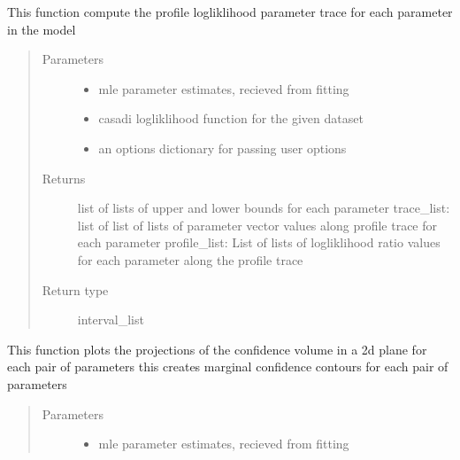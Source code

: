 \documentclass[letterpaper,10pt,english,openany,oneside]{sphinxmanual}
\begin{document}
\begin{fulllineitems}
\begin{fulllineitems}
\label{\detokenize{nloed:nloed.model.Model.__profiletrace}}
This function compute the profile logliklihood parameter trace for each parameter in the model
\begin{quote}\begin{description}
\item[{Parameters}] \leavevmode\begin{itemize}
\item {} 
 \textendash{} mle parameter estimates,  recieved from fitting

\item {} 
 \textendash{} casadi logliklihood function for the given dataset

\item {} 
 \textendash{} an options dictionary for passing user options

\end{itemize}

\item[{Returns}] \leavevmode
list of lists of upper and lower bounds for each parameter
trace\_list: list of list of lists of parameter vector values along profile trace for each parameter
profile\_list: List of lists of logliklihood ratio values for each parameter along the profile trace

\item[{Return type}] \leavevmode
interval\_list

\end{description}\end{quote}

\end{fulllineitems}


\begin{fulllineitems}
\label{\detokenize{nloed:nloed.model.Model.__contourplot}}
This function plots the projections of the confidence volume in a 2d plane for each pair of parameters
this creates marginal confidence contours for each pair of parameters
\begin{quote}\begin{description}
\item[{Parameters}] \leavevmode\begin{itemize}
\item {} 
 \textendash{} mle parameter estimates,  recieved from fitting


\end{itemize}
\end{description}
\end{quote}
\end{fulllineitems}
\end{fulllineitems}
\end{document}
